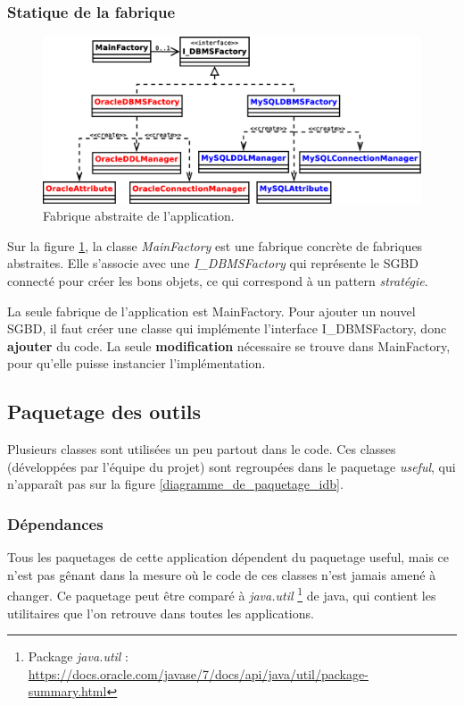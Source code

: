 \subsubsection{Statique de la fabrique}
\begin{figure}[!h]
  \centering
  \includegraphics[width=14cm]{images/diagramme_classes_fabriques.eps}
  \caption{Fabrique abstraite de l'application.}
  \label{diagramme_classes_fabrique}
\end{figure}

Sur la figure \ref{diagramme_classes_fabrique}, la classe \textit{MainFactory} est une fabrique concrète de fabriques abstraites.
Elle s'associe avec une \textit{I\_DBMSFactory} qui représente le SGBD connecté pour créer les bons objets, ce qui correspond à un pattern \textit{stratégie}.

La seule fabrique de l'application est MainFactory.
Pour ajouter un nouvel SGBD, il faut créer une classe qui implémente l'interface I\_DBMSFactory, donc \textbf{ajouter} du code.
La seule \textbf{modification} nécessaire se trouve dans MainFactory, pour qu'elle puisse instancier l'implémentation.

\subsection{Paquetage des outils}
Plusieurs classes sont utilisées un peu partout dans le code.
Ces classes (développées par l'équipe du projet) sont regroupées dans le paquetage \textit{useful}, qui n'apparaît pas sur la figure \ref{diagramme_de_paquetage_idb}.

\subsubsection{Dépendances}
Tous les paquetages de cette application dépendent du paquetage useful, mais ce n'est pas gênant dans la mesure où le code de ces classes n'est jamais amené à changer.
Ce paquetage peut être comparé à \textit{java.util}
\footnote{\label{paguetage_java_util}Package \textit{java.util} : \url{https://docs.oracle.com/javase/7/docs/api/java/util/package-summary.html}}
de java, qui contient les utilitaires que l'on retrouve dans toutes les applications.

